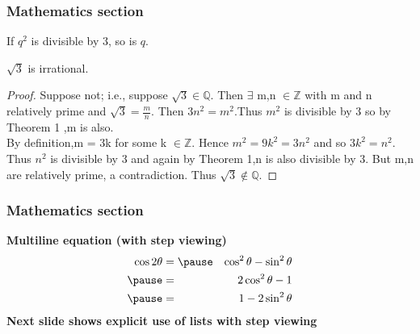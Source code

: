 \documentclass{beamer}
\begin{document}
\begin{frame}[t]
\frametitle{Mathematics section}

\begin{theorem}
 If $q^2 $ is divisible by $3$, so is $q$.
 \end{theorem}
 \begin{theorem}
 $ \sqrt{3} $ is irrational.
 \end{theorem}
\begin{proof}
    Suppose not;  i.e.,  suppose $\sqrt{3} \in \mathbb{Q}$. Then $\exists$ m,n $\in \mathbb{Z}$ with m and n relatively prime and $\sqrt{3} = \frac{m}{n}$. Then $3n^2=m^2$.Thus $m^2$ is divisible by 3 so by Theorem 1 ,m is also.\\ \pause By definition,m = 3k for some k $\in \mathbb{Z}.$  Hence $m^2= 9k^2= 3n^2$ and so $3k^2 = n^2.$ Thus $n^2$ is divisible by 3 and again by Theorem 1,n is also divisible by 3.  But m,n are relatively prime, a contradiction. Thus $\sqrt{3} \notin \mathbb{Q}.$ 
\end{proof}
    
\end{frame}

\begin{frame}[t]
\frametitle{Mathematics section}
\textbf{Multiline equation (with step viewing)}\\
\begin{eqnarray*}
    \cos 2\theta & = \pause & \cos^2 \theta - \sin^2 \theta \\ \pause
                 & =  & 2\cos^2 \theta -1 \\ \pause
                 & =  & 1- 2\sin^2 \theta
\end{eqnarray*}
\vfill
\textbf{Next slide shows explicit use of lists with step viewing}\\

    
\end{frame}
\end{document}
